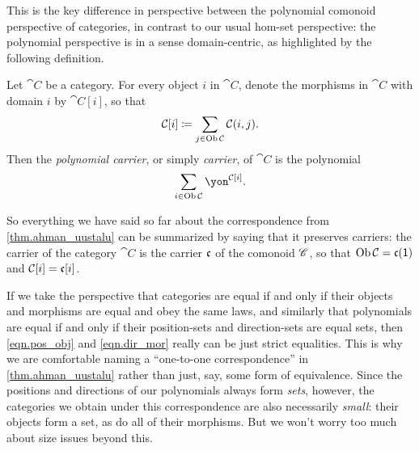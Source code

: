 \documentclass[Book-Poly]{subfiles}
\begin{document}
This is the key difference in perspective between the polynomial comonoid perspective of categories, in contrast to our usual hom-set perspective: the polynomial perspective is in a sense domain-centric, as highlighted by the following definition.

\begin{definition}
Let $\cat{C}$ be a category.
For every object $i$ in $\cat{C}$, denote the morphisms in $\cat{C}$ with domain $i$ by $\cat{C}[i]$, so that
\[
    \mathcal{C}[i]\coloneqq\sum_{j\in\operatorname{Ob}\mathcal{C}}\mathcal{C}(i,j).
\]
Then the \emph{polynomial carrier}, or simply \emph{carrier}, of $\cat{C}$ is the polynomial
\[
    \sum_{i\in\Ob\cat{C}}\yon^{\cat{C}[i]}.
\]
\end{definition}

So everything we have said so far about the correspondence from \cref{thm.ahman_uustalu} can be summarized by saying that it preserves carriers: the carrier of the category $\cat{C}$ is the carrier $\mathfrak{c}$ of the comonoid $\mathscr{C}$, so that $\operatorname{Ob}\mathcal{C}=\mathfrak{c}(\textsf{1})$ and $\mathcal{C}[i]=\mathfrak{c}[i]$.

\begin{remark}
If we take the perspective that categories are equal if and only if their objects and morphisms are equal and obey the same laws, and similarly that polynomials are equal if and only if their position-sets and direction-sets are equal sets, then \eqref{eqn.pos_obj} and \eqref{eqn.dir_mor} really can be just strict equalities.
This is why we are comfortable naming a ``one-to-one correspondence'' in \cref{thm.ahman_uustalu} rather than just, say, some form of equivalence.
Since the positions and directions of our polynomials always form \emph{sets}, however, the categories we obtain under this correspondence are also necessarily \emph{small}: their objects form a set, as do all of their morphisms.
But we won't worry too much about size issues beyond this.
\end{remark}
\end{document}
